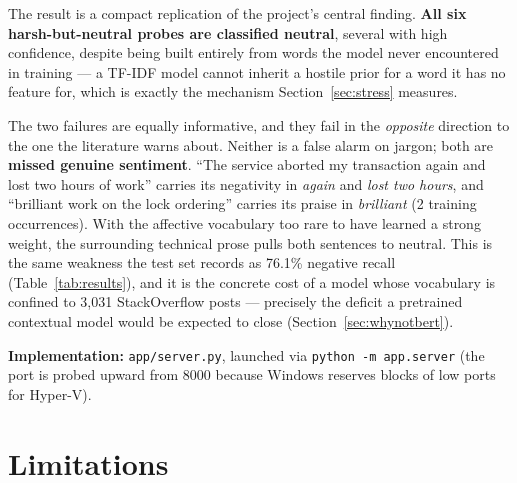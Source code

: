 \documentclass[11pt,a4paper]{article}
\begin{document}
The result is a compact replication of the project's central finding.
\textbf{All six harsh-but-neutral probes are classified neutral}, several with
high confidence, despite being built entirely from words the model never
encountered in training --- a TF-IDF model cannot inherit a hostile prior for a
word it has no feature for, which is exactly the mechanism
Section~\ref{sec:stress} measures.

The two failures are equally informative, and they fail in the
\textit{opposite} direction to the one the literature warns about. Neither is a
false alarm on jargon; both are \textbf{missed genuine sentiment}. ``The
service aborted my transaction again and lost two hours of work'' carries its
negativity in \textit{again} and \textit{lost two hours}, and ``brilliant work
on the lock ordering'' carries its praise in \textit{brilliant} (2 training
occurrences). With the affective vocabulary too rare to have learned a strong
weight, the surrounding technical prose pulls both sentences to neutral. This
is the same weakness the test set records as 76.1\% negative recall
(Table~\ref{tab:results}), and it is the concrete cost of a model whose
vocabulary is confined to 3,031 StackOverflow posts --- precisely the deficit a
pretrained contextual model would be expected to close
(Section~\ref{sec:whynotbert}).

\textbf{Implementation:} \texttt{app/server.py}, launched via
\texttt{python -m app.server} (the port is probed upward from 8000 because
Windows reserves blocks of low ports for Hyper-V).

\section{Limitations}
\label{sec:limitations}
\end{document}
